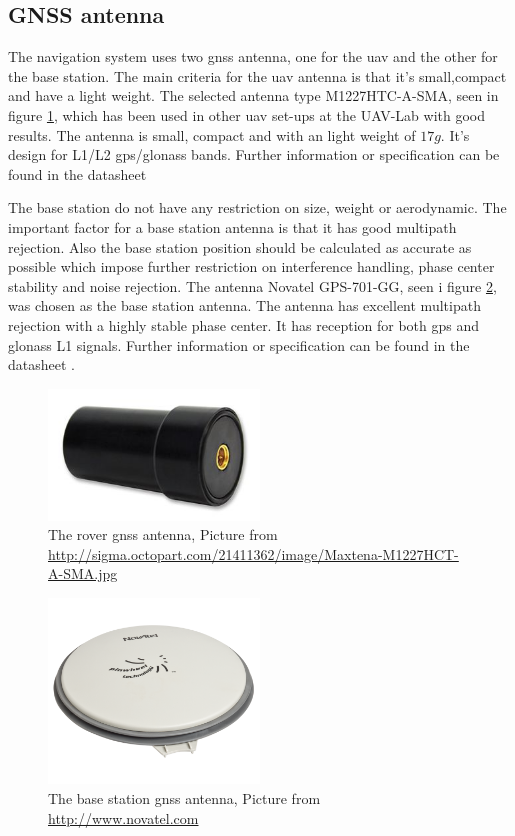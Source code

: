 \subsection{GNSS antenna}
The navigation system uses two \gls{gnss} antenna, one for the \gls{uav} and the other for the base station. The main criteria for the \gls{uav} antenna is that it's small,compact and have a light weight.
The selected antenna type M1227HTC-A-SMA, seen in figure \ref{figure:Maxtena}, which has been used in other \gls{uav} set-ups at the UAV-Lab with good results. The antenna is small, compact and with an light weight of $17g$. It's design for L1/L2 gps/glonass bands. Further information or specification can be found in the datasheet \citep{maxtena}

The base station do not have any restriction on size, weight or aerodynamic. The important factor for a base station antenna is that it has good multipath rejection. Also the base station position should be calculated as accurate as possible which impose further restriction on interference handling, phase center stability and noise rejection.
The antenna Novatel GPS-701-GG, seen i figure \ref{figure:Novatel}, was chosen as the base station antenna. The antenna has excellent multipath rejection with a highly stable phase center. It has reception for both \gls{gps} and \gls{glonass} L1 signals. Further information or specification can be found in the datasheet \citep{novatel}.

\begin{figure}[H]
	\centering
		\includegraphics[width=0.5\textwidth]{figs/Maxtena-M1227HCT-A-SMA-image.jpg}
		\caption{The rover \gls{gnss} antenna, Picture from \url{http://sigma.octopart.com/21411362/image/Maxtena-M1227HCT-A-SMA.jpg}}
		\label{figure:Maxtena}
\end{figure}

\begin{figure}[H]
	\centering
		\includegraphics[width=0.5\textwidth]{figs/702-L.png}
		\caption{The base station \gls{gnss} antenna, Picture from \url{http://www.novatel.com}}
		\label{figure:Novatel}
\end{figure}


